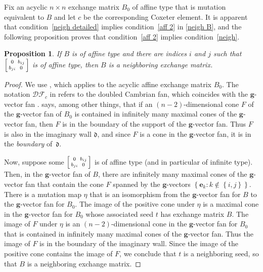 \documentclass{amsart}
\newtheorem{proposition}{Proposition}[section]
\theoremstyle{definition}
\theoremstyle{remark}
\numberwithin{equation}{section}
\newcommand{\set}[1]{{\left\lbrace #1 \right\rbrace}}
\newcommand{\0}{{\mathbf{0}}}
\newcommand{\g}{\mathbf{g}}
\renewcommand{\b}{\mathbf{b}}
\newcommand{\e}{\mathbf{e}}
\renewcommand{\d}{{\mathfrak d}}
\newcommand{\DF}{{\mathcal {DF}}}
\begin{document}
Fix an acyclic $n\times n$ exchange matrix $B_0$ of affine type that is mutation equivalent to $B$ and let $c$ be the corresponding Coxeter element.
It is apparent that condition~\eqref{neigh detailed} implies condition~\eqref{aff 2} in \cref{neigh B}, and the following proposition proves that condition~\eqref{aff 2} implies condition~\eqref{neigh}.
\begin{proposition}\label{aff 2 block}
If $B$ is of affine type and there are indices $i$ and $j$ such that $\begin{bsmallmatrix}0&b_{ij}\\b_{ji}&0\end{bsmallmatrix}$ is of affine type, then $B$ is a neighboring exchange matrix.
\end{proposition}

\begin{proof}
We use \cite[Corollary~4.18]{afframe}, which applies to the acyclic affine exchange matrix $B_0$.
The notation $\DF_c$ in \cite{afframe} refers to the doubled Cambrian fan, which coincides with the $\g$-vector fan \cite[Corollary~1.3]{afframe}.
\cite[Corollary~4.18]{afframe} says, among other things, that if an $(n-2)$-dimensional cone $F$ of the $\g$-vector fan of $B_0$ is contained in infinitely many maximal cones of the $\g$-vector fan, then $F$ is in the boundary of the support of the $\g$-vector fan.
Thus $F$ is also in the imaginary wall $\d$, and since $F$ is a cone in the $\g$-vector fan, it is in the \emph{boundary} of~$\d$.

Now, suppose some $\begin{bsmallmatrix}0&b_{ij}\\b_{ji}&0\end{bsmallmatrix}$ is of affine type (and in particular of infinite type).
Then, in the $\g$-vector fan of $B$, there are infinitely many maximal cones of the $\g$-vector fan that contain the cone $F$ spanned by the $\g$-vectors $\set{\e_k:k\not\in\set{i,j}}$.
There is a mutation map $\eta$ that is an isomorphism from the $\g$-vector fan for $B$ to the $\g$-vector fan for $B_0$.
The image of the positive cone under $\eta$ is a maximal cone in the $\g$-vector fan for $B_0$ whose associated seed $t$ has exchange matrix $B$.
The image of $F$ under $\eta$ is an $(n-2)$-dimensional cone in the $\g$-vector fan for $B_0$ that is contained in infinitely many maximal cones of the $\g$-vector fan.
Thus the image of $F$ is in the boundary of the imaginary wall.
Since the image of the positive cone contains the image of $F$, we conclude that $t$ is a neighboring seed, so that $B$ is a neighboring exchange matrix.
\end{proof}
\end{document}
